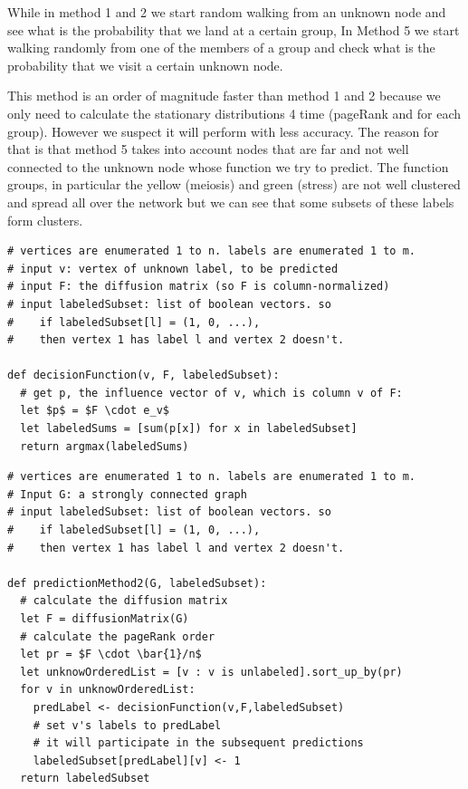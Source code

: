 \begin{itemize}
While in method 1 and 2 we start random walking from an unknown node and see
what is the probability that we land at a certain group, In Method 5 we start
walking randomly from one of the members of a group and check what is the
probability that we visit a certain unknown node.

This method is an order of magnitude faster than method 1 and 2 because we only
need to calculate the stationary distributions 4 time (pageRank and for each
group). However we suspect it will perform with less accuracy.
The reason for that is that method 5 takes into account nodes that are far and not well connected to the
unknown node whose function we try to predict.
The function groups, in particular the yellow (meiosis) and green (stress) are not
well clustered and spread all over the network but we can see that
some subsets of these labels form clusters.

\end{itemize}

\begin{lstlisting}[mathescape=true, 
    caption = {method 2, decision funciton}, label={code:decision_function}]
# vertices are enumerated 1 to n. labels are enumerated 1 to m.
# input v: vertex of unknown label, to be predicted
# input F: the diffusion matrix (so F is column-normalized)
# input labeledSubset: list of boolean vectors. so
#    if labeledSubset[l] = (1, 0, ...),
#    then vertex 1 has label l and vertex 2 doesn't.

def decisionFunction(v, F, labeledSubset):
  # get p, the influence vector of v, which is column v of F:
  let $p$ = $F \cdot e_v$
  let labeledSums = [sum(p[x]) for x in labeledSubset]
  return argmax(labeledSums)
\end{lstlisting}

\begin{lstlisting}[mathescape=true, 
    caption = {method 2, main funciton}, label={code:method2}]
# vertices are enumerated 1 to n. labels are enumerated 1 to m.
# Input G: a strongly connected graph
# input labeledSubset: list of boolean vectors. so 
#    if labeledSubset[l] = (1, 0, ...),
#    then vertex 1 has label l and vertex 2 doesn't.

def predictionMethod2(G, labeledSubset):
  # calculate the diffusion matrix
  let F = diffusionMatrix(G)
  # calculate the pageRank order
  let pr = $F \cdot \bar{1}/n$
  let unknowOrderedList = [v : v is unlabeled].sort_up_by(pr)
  for v in unknowOrderedList:
    predLabel <- decisionFunction(v,F,labeledSubset)
    # set v's labels to predLabel
    # it will participate in the subsequent predictions
    labeledSubset[predLabel][v] <- 1
  return labeledSubset
\end{lstlisting}

